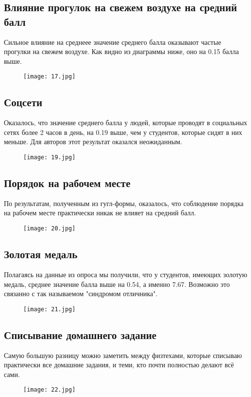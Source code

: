 \documentclass[a4paper,12pt]{article}
\begin{document}
\subsection{Влияние прогулок на свежем воздухе на средний балл}
Сильное влияние на среднеее значение среднего балла оказывают частые прогулки на свежем воздухе. Как видно из диаграммы ниже, оно на 0.15 балла выше.
\begin{figure}[h!]\centering
    \texttt{[image: 17.jpg]}
    \label{1_1}
\end{figure}


\subsection{Соцсети}
Оказалось, что значение среднего балла у людей, которые проводят в социальных сетях более 2 часов в день, на 0.19 выше, чем у студентов, которые сидят в них меньше. Для авторов этот результат оказался неожиданным.
\begin{figure}[h!]\centering
    \texttt{[image: 19.jpg]}
    \label{1_1}
\end{figure}
\newpage
\subsection{Порядок на рабочем месте}
По результатам, полученным из гугл-формы, оказалось, что соблюдение порядка на рабочем месте практически никак не влияет на средний балл.
\begin{figure}[h!]\centering
    \texttt{[image: 20.jpg]}
    \label{1_1}
\end{figure}

\subsection{Золотая медаль}
Полагаясь на данные из опроса мы получили, что у студентов, имеющих золотую медаль, среднее значение балла выше на 0.54, а именно 7.67. Возможно это связанно с так называемом "синдромом отличника".
\begin{figure}[h!]\centering
    \texttt{[image: 21.jpg]}
    \label{1_1}
\end{figure}
\newpage
\subsection{Списывание домашнего задание}
Самую большую разницу можно заметить между физтехами, которые списываю практически все домашние задания, и теми, кто почти полностью делают всё сами. 
\begin{figure}[h!]\centering
    \texttt{[image: 22.jpg]}
    \label{1_1}
\end{figure}
\end{document}
